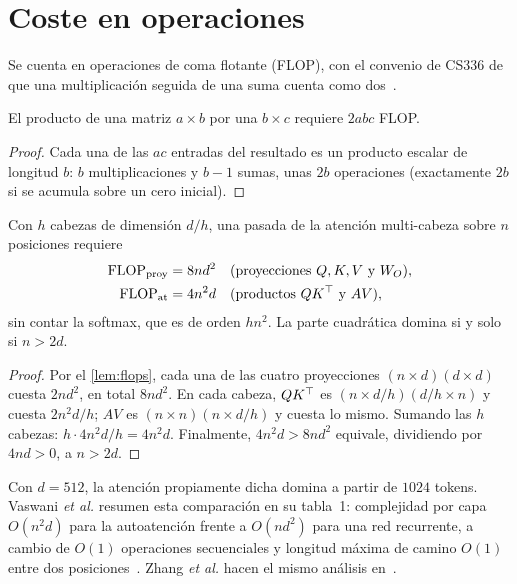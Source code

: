 \section{Coste en operaciones}

Se cuenta en operaciones de coma flotante (FLOP), con el convenio de CS336 de que una multiplicación seguida de una suma cuenta como dos~\cite[§3.5]{cs336}.

\begin{lema}\label{lem:flops}
El producto de una matriz $a\times b$ por una $b\times c$ requiere $2abc$ FLOP.
\end{lema}

\begin{proof}
Cada una de las $ac$ entradas del resultado es un producto escalar de longitud $b$: $b$ multiplicaciones y $b-1$ sumas, unas $2b$ operaciones (exactamente $2b$ si se acumula sobre un cero inicial).
\end{proof}

\begin{proposicion}\label{prop:coste}
Con $h$ cabezas de dimensión $d/h$, una pasada de la atención multi-cabeza sobre $n$ posiciones requiere
\begin{align*}
\mathrm{FLOP}_{\text{proy}}&=8nd^{2} &&\text{(proyecciones $Q,K,V$ y $W_{O}$)},\\
\mathrm{FLOP}_{\text{at}}&=4n^{2}d &&\text{(productos $QK^{\top}$ y $AV$)},
\end{align*}
sin contar la softmax, que es de orden $hn^{2}$. La parte cuadrática domina si y solo si $n>2d$.
\end{proposicion}

\begin{proof}
Por el \cref{lem:flops}, cada una de las cuatro proyecciones $(n\times d)(d\times d)$ cuesta $2nd^{2}$, en total $8nd^{2}$. En cada cabeza, $QK^{\top}$ es $(n\times d/h)(d/h\times n)$ y cuesta $2n^{2}d/h$; $AV$ es $(n\times n)(n\times d/h)$ y cuesta lo mismo. Sumando las $h$ cabezas: $h\cdot 4n^{2}d/h=4n^{2}d$. Finalmente, $4n^{2}d>8nd^{2}$ equivale, dividiendo por $4nd>0$, a $n>2d$.
\end{proof}

Con $d=512$, la atención propiamente dicha domina a partir de $1024$ tokens. Vaswani \emph{et al.} resumen esta comparación en su tabla~1: complejidad por capa $O(n^{2}d)$ para la autoatención frente a $O(nd^{2})$ para una red recurrente, a cambio de $O(1)$ operaciones secuenciales y longitud máxima de camino $O(1)$ entre dos posiciones~\cite[§4]{vaswani}. Zhang \emph{et al.} hacen el mismo análisis en~\cite[§11.6.2]{d2l}.

